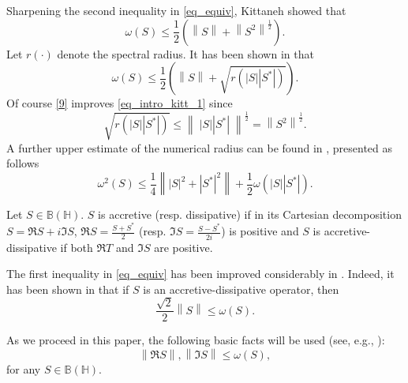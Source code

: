 \documentclass[12pt,twoside,reqno]{amsart}
\numberwithin{equation}{section}
\begin{document}
Sharpening the second inequality in \eqref{eq_equiv}, Kittaneh showed that \cite{Kittaneh_Studia_2003}
\begin{equation}\label{eq_intro_kitt_1}
\omega \left( S \right)\le \frac{1}{2}\left( \left\| S \right\|+{{\left\| {{S}^{2}} \right\|}^{\frac{1}{2}}} \right).
\end{equation}
Let $r\left( \cdot \right)$ denote the spectral radius. It has been shown in \cite[Theorem 2.1]{BP} that
\begin{equation}\label{9}
\omega \left( S \right)\le \frac{1}{2}\left( \left\| S \right\|+\sqrt{r\left( \left| S \right|\left| {{S}^{*}} \right| \right)} \right).
\end{equation}
Of course \eqref{9} improves \eqref{eq_intro_kitt_1} since 
\[\sqrt{r\left( \left| S \right|\left| {{S}^{*}} \right| \right)}\le {{\left\| \;\left| S \right|\left| {{S}^{*}} \right|\; \right\|}^{\frac{1}{2}}}={{\left\| {{S}^{2}} \right\|}^{\frac{1}{2}}}.\]
A further upper estimate of the numerical radius can be found in \cite[Corollary 3.3]{Heydarbeygi}, presented as follows
\begin{equation}\label{29}
{{\omega }^{2}}\left( S \right)\le \frac{1}{4}\left\| {{\left| S \right|}^{2}}+{{\left| {{S}^{*}} \right|}^{2}} \right\|+\frac{1}{2}\omega \left( \left| S \right|\left| {{S}^{*}} \right| \right).
\end{equation}


Let $S\in\mathbb{B}(\mathbb{H})$. $S$ is accretive (resp. dissipative) if in its Cartesian decomposition $S=\Re S+i\Im S$, $\Re S=\frac{S+{{S}^{*}}}{2}$ (resp. $\Im S=\frac{S-{{S}^{*}}}{2i}$) is positive and $S$ is accretive-dissipative if both $\Re T$ and $\Im S$ are positive. 

The first inequality in \eqref{eq_equiv} has been improved considerably in \cite{MS}. Indeed, it has been shown in \cite[Theorem 2.6]{MS} that if $S$ is an accretive-dissipative operator, then
\begin{equation}\label{12}
\frac{\sqrt{2}}{2}\left\| S \right\|\le \omega \left( S \right).
\end{equation}

As we proceed in this paper, the following basic facts will be used (see, e.g., \cite[Ineq. (2.3) and Ineq. (2.4)]{OM}):
\begin{equation}\label{21}
\left\| \Re S \right\|,\left\| \Im S \right\|\le \omega \left( S \right),
\end{equation}
for any $S\in\mathbb{B}(\mathbb{H})$.
\end{document}
